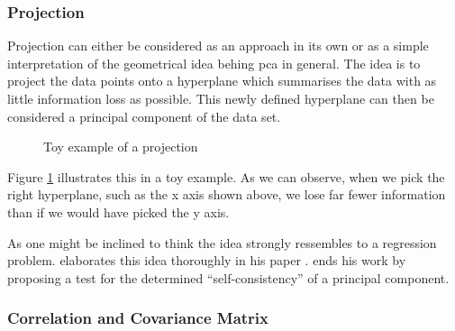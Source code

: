 \subsubsection{Projection}



Projection can either be considered as an approach in its own or as a simple interpretation of the geometrical idea behing \gls{pca} in general.
The idea is to project the data points onto a \gls{hyperplane} which summarises the data with as little information loss as possible.
This newly defined hyperplane can then be considered a principal component of the data set.


\renewcommand{\tikzscale}{0.4}
\begin{figure}[h]
	\centering
	
	\captionsetup{justification=centering}
	\vspace*{4mm}
	\caption{Toy example of a projection}
    \label{fig:projectionExample}
\end{figure}


Figure \ref{fig:projectionExample} illustrates this in a toy example.
As we can observe, when we pick the right \gls{hyperplane}, such as the x axis shown above, we lose far fewer information than if we would have picked the y axis.\bigskip


As one might be inclined to think the idea strongly ressembles to a regression problem. 
\citeauthor{tarpey1999self} elaborates this idea thoroughly in his paper  \cite{tarpey1999self}.
\citeauthor{tarpey1999self} ends his work by proposing a test for the determined ``self-consistency'' of a principal component.






\clearpage



\subsubsection{Correlation and Covariance Matrix}


